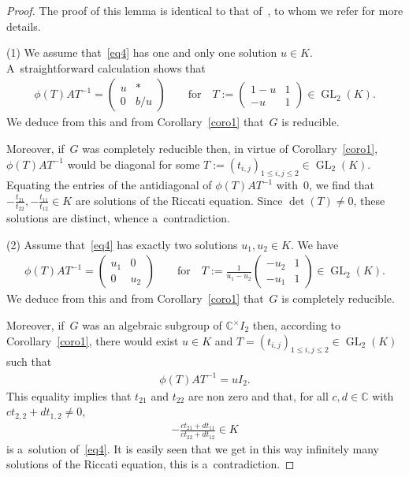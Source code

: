 \documentclass[11pt]{article}
\numberwithin{equation}{section}
\begin{document}
\begin{proof}
The proof of this lemma is identical to that of~\cite[Theorem~4.2]{Hen98}, to whom we refer for more details.

(1) We assume that~\eqref{eq4} has one and only one solution $u\in K$.
A~straightforward calculation shows that
\begin{gather*}
\phi(T)AT^{-1}=
\begin{pmatrix}
u&*
\\
0&b/u
\end{pmatrix}
\qquad \text{for} \quad T:=
\begin{pmatrix}
1-u&1
\\
-u&1
\end{pmatrix}
\in\operatorname{GL}_{2}(K).
\end{gather*}
We deduce from this and from Corollary~\ref{coro1} that~$G$ is reducible.

Moreover, if~$G$ was completely reducible then, in virtue of Corollary~\ref{coro1}, $\phi(T)AT^{-1}$ would be diagonal
for some ${T:= (t_{i,j})_{1 \leq i,j\leq 2}\in \operatorname{GL}_{2}(K)}$.
Equating the entries of the antidiagonal of $\phi(T)AT^{-1}$ with~$0$, we f\/ind that
$-\frac{t_{21}}{t_{22}},-\frac{t_{11}}{t_{12}}\in K $ are solutions of the Riccati equation.
Since $\det(T) \neq 0$, these solutions are distinct, whence a~contradiction.

(2) Assume that~\eqref{eq4} has exactly two solutions $u_{1},u_{2}\in K$.
We have
\begin{gather*}
\phi(T)AT^{-1}=
\begin{pmatrix}
u_{1}&0
\\
0&u_{2}
\end{pmatrix}
\qquad \text{for}\quad T:=\frac{1}{u_{1}-u_{2}}
\begin{pmatrix}
-u_{2}&1
\\
-u_{1}&1
\end{pmatrix}
\in \operatorname{GL}_{2}(K).
\end{gather*}
We deduce from this and from Corollary~\ref{coro1} that~$G$ is completely reducible.

Moreover, if~$G$ was an algebraic subgroup of $\mathbb C^{\times} I_{2}$ then, according to Corollary~\ref{coro1}, there
would exist $u\in K$ and $T= (t_{i,j})_{1 \leq i,j\leq 2} \in \operatorname{GL}_{2}(K)$ such that
\begin{gather*}
\phi(T)AT^{-1}=u I_{2}.
\end{gather*}
This equality implies that $t_{21}$ and $t_{22}$ are non zero and that, for all $c,d\in \mathbb C$ with
$ct_{2,2}+dt_{1,2} \neq 0$,
\begin{gather*}
-\frac{ct_{21}+dt_{11}}{ct_{22}+dt_{12}}\in K
\end{gather*}
is a~solution of~\eqref{eq4}.
It is easily seen that we get in this way inf\/initely many solutions of the Riccati equation, this is a~contradiction.


\end{proof}
\end{document}
